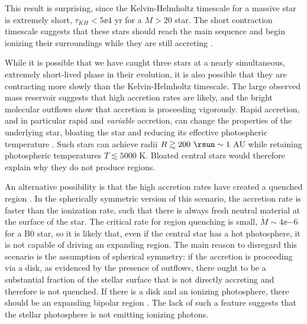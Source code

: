 \documentclass[twocolumn]{aastex61}
\begin{document}


This result is surprising, since the Kelvin-Helmholtz timescale for a massive
star is extremely short, $\tau_{KH} < 5\ee{4}$ yr for a $M>20$ \msun star.  The
short contraction timescale suggests that these stars should reach the main
sequence and begin ionizing their surroundings while they are still accreting
\citep{Zinnecker2007a}.

While it is possible that we have caught three stars at a nearly simultaneous,
extremely short-lived phase in their evolution, it is also possible that they
are contracting more slowly than the Kelvin-Helmholtz timescale.  The large
observed mass reservoir suggests that high accretion rates are likely, and the
bright molecular outflows show that accretion is proceeding vigorously.  Rapid
accretion, and in particular rapid and \emph{variable} accretion, can change
the properties of the underlying star, bloating the star and reducing its
effective photospheric temperature \citep{Hosokawa2009a, Smith2012h,
Hosokawa2016a}.  Such stars can achieve radii $R\gtrsim200~\rsun \sim 1$ AU
while retaining photospheric temperatures $T\lesssim5000$ K.  Bloated central
stars would therefore explain why they do not produce \hii regions.

An alternative possibility is that the high accretion rates have created a
quenched \hii region \citep{Walmsley1995b,Osorio1999a,Keto2006a}.  In the
spherically symmetric version of this scenario, the accretion rate is faster
than the ionization rate, such that there is always fresh neutral material 
 at the surface of the star.  The critical rate for \hii region quenching
is small, $\dot{M} \sim 4\ee{-6}$ \msun \peryr for a B0 star, so it is likely
that, even if the central star has a hot photosphere, it is not capable of
driving an expanding \hii region.  The main reason to disregard this scenario
is the assumption of spherical symmetry: if the accretion is proceeding via a
disk, as evidenced by the presence of outflows, there ought to be a substantial
fraction of the stellar surface that is not directly accreting and therefore is
not quenched.  If there is a disk and an ionizing photosphere, there should be
an expanding bipolar \hii region \citep{Keto2006a}.  The lack of such a feature
suggests that the stellar photosphere is not emitting ionizing photons.
\end{document}
